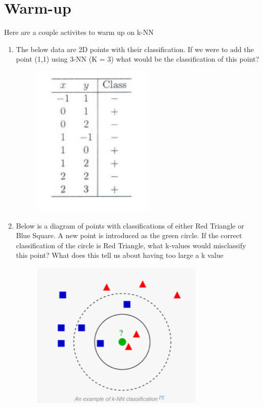\documentclass{report}
\begin{document}





\section*{Warm-up}
Here are a couple activites to warm up on k-NN 
\begin{enumerate}
	\item The below data are 2D points with their classification. If we were to add the point (1,1) using 3-NN (K = 3) what would be the classification of this point?
	\begin{figure}[H]
		\centering
		\includegraphics{image/Picture1.png}
	\end{figure}
	\item Below is a diagram of points with classifications of either Red Triangle or Blue Square. A new point is introduced as the green circle. If the correct classification of the circle is Red Triangle, what k-values would misclassify this point? What does this tell us about having too large a k value
	\begin{figure}[H]
		\centering
		\includegraphics{image/Picture2.png}

\end{figure}
\end{enumerate}
\end{document}
